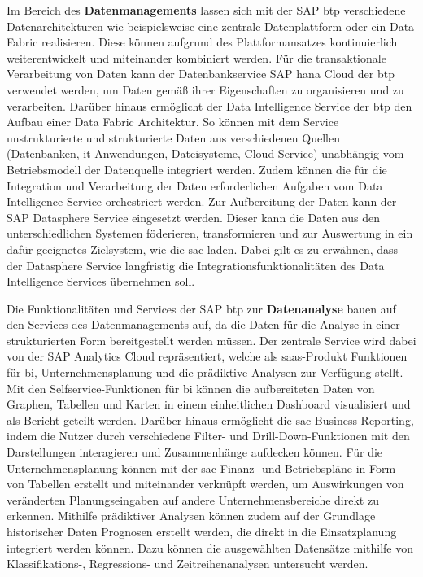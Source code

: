 Im Bereich des \textbf{Datenmanagements} lassen sich mit der SAP \ac{btp} verschiedene Datenarchitekturen wie beispielsweise eine zentrale Datenplattform oder ein Data Fabric realisieren. Diese können aufgrund des Plattformansatzes kontinuierlich weiterentwickelt und miteinander kombiniert werden. Für die transaktionale Verarbeitung von Daten kann der Datenbankservice SAP \ac{hana} Cloud der \ac{btp} verwendet werden, um Daten gemäß ihrer Eigenschaften zu organisieren und zu verarbeiten. Darüber hinaus ermöglicht der Data Intelligence Service der \ac{btp} den Aufbau einer Data Fabric Architektur. \autocite[Vgl.][S. 64-66]{SEUBERT} So können mit dem Service unstrukturierte und strukturierte Daten aus verschiedenen Quellen (Datenbanken, \ac{it}-Anwendungen, Dateisysteme, Cloud-Service) unabhängig vom Betriebsmodell der Datenquelle integriert werden. Zudem können die für die Integration und Verarbeitung der Daten erforderlichen Aufgaben vom Data Intelligence Service orchestriert werden. \autocite[Vgl.][]{DATAINTELLIGENCE} Zur Aufbereitung der Daten kann der SAP Datasphere Service eingesetzt werden. Dieser kann die Daten aus den unterschiedlichen Systemen föderieren, transformieren und zur Auswertung in ein dafür geeignetes Zielsystem, wie die \ac{sac} laden. \autocite[Vgl.][S. 3]{FSDDATASPHERE}  Dabei gilt es zu erwähnen, dass der Datasphere Service langfristig die Integrationsfunktionalitäten des Data Intelligence Services übernehmen soll. \autocite[Vgl.][]{QUIRK2023}

Die Funktionalitäten und Services der SAP \ac{btp} zur \textbf{Datenanalyse} bauen auf den Services des Datenmanagements auf, da die Daten für die Analyse in einer strukturierten Form bereitgestellt werden müssen. Der zentrale Service wird dabei von der SAP Analytics Cloud repräsentiert, welche als \ac{saas}-Produkt Funktionen für \ac{bi}, Unternehmensplanung und die prädiktive Analysen zur Verfügung stellt. Mit den Selfservice-Funktionen für \ac{bi} können die aufbereiteten Daten von Graphen, Tabellen und Karten in einem einheitlichen Dashboard visualisiert und als Bericht geteilt werden. Darüber hinaus ermöglicht die \ac{sac} Business Reporting, indem die Nutzer durch verschiedene Filter- und Drill-Down-Funktionen mit den Darstellungen interagieren und Zusammenhänge aufdecken können. Für die Unternehmensplanung können mit der \ac{sac} Finanz- und Betriebspläne in Form von Tabellen erstellt und miteinander verknüpft werden, um Auswirkungen von veränderten Planungseingaben auf andere Unternehmensbereiche direkt zu erkennen. Mithilfe prädiktiver Analysen können zudem auf der Grundlage historischer Daten Prognosen erstellt werden, die direkt in die Einsatzplanung integriert werden können. \autocite[Vgl.][S. 64-67]{SEUBERT} Dazu können die ausgewählten Datensätze mithilfe von Klassifikations-, Regressions- und Zeitreihenanalysen untersucht werden. \autocite[Vgl.][]{FSDSAC2023}

